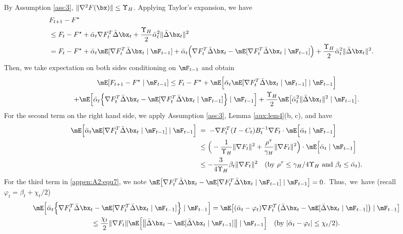 By Assumption \ref{ass:3}, $\|\nabla^2 F(\bx)\|\leq \Upsilon_H$. Applying Taylor's expansion, we have
\begin{align}\label{appen:A2:equ8}
&\hskip-0.5cm  F_{t+1}-F^\star \nonumber\\
&\hskip-0.5cm \leq F_t-F^\star + \bar{\alpha}_t \nabla F_t^T\bar{\Delta} \bx_t + \frac{\Upsilon_{H}}{2}\bar{\alpha}_t^2\|\bar{\Delta}\bx_t\|^2 \nonumber\\
&\hskip-0.5cm = F_t-F^{\star}+\bar{\alpha}_t\mE[\nabla F_t^T\bar{\Delta} \bx_t\mid\mF_{t-1}]+\bar{\alpha}_t\Big(\nabla F_t^T\bar{\Delta}\bx_t-\mE[\nabla F_t^T\bar{\Delta} \bx_t\mid\mF_{t-1}]\Big)+\frac{\Upsilon_H}{2}\bar{\alpha}_t^2\|\bar{\Delta}\bx_t\|^2.
\end{align}
Then, we take expectation on both sides conditioning on $\mF_{t-1}$ and obtain
\begin{multline}\label{appen:A2:equ7}
\mE[F_{t+1}-F^\star\mid\mF_{t-1}] \leq F_t-F^\star
+ \mE\Big[\bar{\alpha}_t\mE[\nabla F_t^T\bar{\Delta} \bx_t\mid\mF_{t-1}]\mid \mF_{t-1}\Big]\\
+\mE\Big[\bar{\alpha}_t\Big\{\nabla F_t^T\bar{\Delta}\bx_t-\mE[\nabla F_t^T\bar{\Delta} \bx_t\mid\mF_{t-1}]\Big\}\mid\mF_{t-1}\Big]+\frac{\Upsilon_H}{2}\mE\big[\bar{\alpha}_t^2\|\bar{\Delta}\bx_t\|^2\mid\mF_{t-1}\big].
\end{multline}
For the second term on the right hand side, we apply Assumption \ref{ass:3}, Lemma \ref{aux:lem4}(b, c), and have
\begin{align}\label{appen:A2:equ4}
\mE\Big[\bar{\alpha}_t\mE[\nabla F_t^T\bar{\Delta} \bx_t\mid\mF_{t-1}]\mid \mF_{t-1}\Big]\; &=\; -\nabla F_t^T(I-C_t)B_t^{-1}\nabla F_t \cdot \mE\Big[\bar{\alpha}_t\mid \mF_{t-1}\Big]\nonumber\\
&\leq\Big(- \frac{1}{\Upsilon_H}\|\nabla F_t\|^2 + \frac{\rho^{\tau}}{\gamma_H}\|\nabla F_t\|^2\Big)\cdot \mE\Big[\bar{\alpha}_t\mid \mF_{t-1}\Big]\nonumber\\
&\leq -\frac{3}{4\Upsilon_H}\beta_t\|\nabla F_t\|^2\quad(\text{by }\rho^\tau\leq \gamma_H/4\Upsilon_H\text{ and }\beta_t\leq \bar{\alpha}_t).
\end{align}
For the third term in \eqref{appen:A2:equ7}, we note $\mE\big[\nabla F_t^T\bar{\Delta}\bx_t - \mE[\nabla F_t^T\bar{\Delta}\bx_t\mid\mF_{t-1}]\mid\mF_{t-1}\big]=0$.~Thus,~we~have (recall $\varphi_t=\beta_t+\chi_t/2$)
\begin{multline}\label{appen:A2:equ1}
\mE\Big[\bar{\alpha}_t\Big\{\nabla F_t^T\bar{\Delta}\bx_t-\mE[\nabla F_t^T\bar{\Delta} \bx_t\mid\mF_{t-1}]\Big\}\mid\mF_{t-1}\Big]= \mE\big[(\bar{\alpha}_t-\varphi_t)\nabla F_t^T\big(\bar{\Delta}\bx_t-\mE[\bar{\Delta} \bx_t\mid\mF_{t-1}]\big)\mid\mF_{t-1}\big]\\
\leq \frac{\chi_t}{2}\|\nabla F_t\|\mE\Big[\big\|\bar{\Delta}\bx_t - \mE[\bar{\Delta}\bx_t\mid\mF_{t-1}]\big\|\mid\mF_{t-1}\Big]\quad (\text{by } |\bar{\alpha}_t-\varphi_t|\leq \chi_t/2).
\end{multline}
